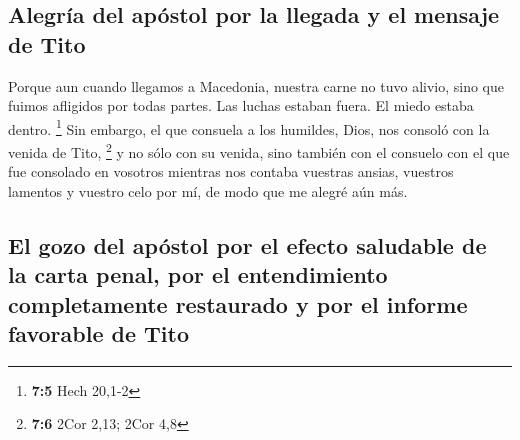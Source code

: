 \begin{paracol}{2}
\hypertarget{alegruxeda-del-apuxf3stol-por-la-llegada-y-el-mensaje-de-tito}{%
\subsection{Alegría del apóstol por la llegada y el mensaje de
Tito}\label{alegruxeda-del-apuxf3stol-por-la-llegada-y-el-mensaje-de-tito}}

 Porque aun cuando llegamos a Macedonia, nuestra carne no
tuvo alivio, sino que fuimos afligidos por todas partes. Las luchas
estaban fuera. El miedo estaba dentro. \footnote{\textbf{7:5} Hech
  20,1-2}  Sin embargo, el que consuela a los humildes,
Dios, nos consoló con la venida de Tito, \footnote{\textbf{7:6} 2Cor
  2,13; 2Cor 4,8}  y no sólo con su venida, sino también
con el consuelo con el que fue consolado en vosotros mientras nos
contaba vuestras ansias, vuestros lamentos y vuestro celo por mí, de
modo que me alegré aún más.

\hypertarget{el-gozo-del-apuxf3stol-por-el-efecto-saludable-de-la-carta-penal-por-el-entendimiento-completamente-restaurado-y-por-el-informe-favorable-de-tito}{%
\subsection{El gozo del apóstol por el efecto saludable de la carta
penal, por el entendimiento completamente restaurado y por el informe
favorable de
Tito}\label{el-gozo-del-apuxf3stol-por-el-efecto-saludable-de-la-carta-penal-por-el-entendimiento-completamente-restaurado-y-por-el-informe-favorable-de-tito}}


\end{paracol}
